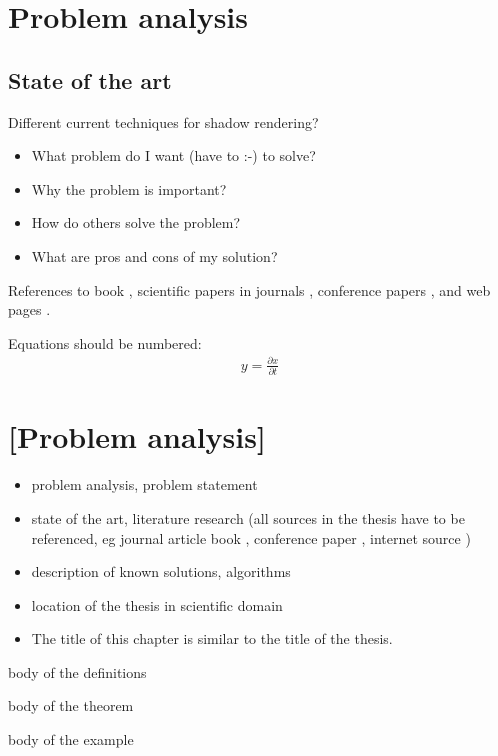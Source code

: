 \chapter{Problem analysis} %

\section{State of the art}

Different current techniques for shadow rendering?

\begin{itemize}
\item What problem do I want (have to :-) to solve?
\item Why the problem is important?
\item How do others solve the problem?
\item What are pros and cons of my solution?
\end{itemize}

References to 
book \cite{bib:book},
scientific papers in journals \cite{bib:article},
conference papers \cite{bib:conference},
and web pages \cite{bib:internet}.

Equations should be numbered:
\begin{align}
y = \frac{\partial x}{\partial t}
\end{align}

\chapter{[Problem analysis]}

\begin{itemize}
\item problem analysis, problem statement
\item state of the art, literature research (all sources in the thesis have to be referenced, eg journal article \cite{bib:article} book \cite{bib:book}, conference paper \cite{bib:conference}, internet source \cite{bib:internet})
\item description of known solutions, algorithms
\item location of the thesis in scientific domain
\item The title of this chapter is similar to the title of the thesis.
\end{itemize}

\begin{Definition}\label{def:definition}
body of the definitions
\end{Definition}

\begin{Theorem}\label{t:theorem}
body of the theorem
\end{Theorem}

\begin{Example}\label{ex:example}
body of the example
\end{Example}



